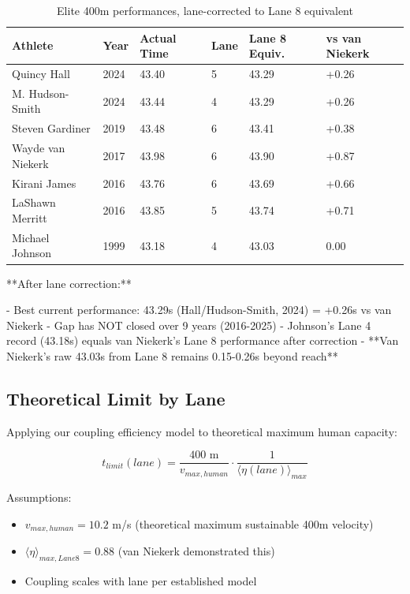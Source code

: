 \begin{table}[H]
\centering
\caption{Elite 400m performances, lane-corrected to Lane 8 equivalent}
\begin{tabular}{@{}llllll@{}}
\toprule
\textbf{Athlete} & \textbf{Year} & \textbf{Actual Time} & \textbf{Lane} & \textbf{Lane 8 Equiv.} & \textbf{vs van Niekerk} \\
\midrule
Quincy Hall & 2024 & 43.40 & 5 & 43.29 & +0.26 \\
M. Hudson-Smith & 2024 & 43.44 & 4 & 43.29 & +0.26 \\
Steven Gardiner & 2019 & 43.48 & 6 & 43.41 & +0.38 \\
Wayde van Niekerk & 2017 & 43.98 & 6 & 43.90 & +0.87 \\
Kirani James & 2016 & 43.76 & 6 & 43.69 & +0.66 \\
LaShawn Merritt & 2016 & 43.85 & 5 & 43.74 & +0.71 \\
Michael Johnson & 1999 & 43.18 & 4 & 43.03 & 0.00 \\
\bottomrule
\end{tabular}
\end{table}

**After lane correction:**

- Best current performance: 43.29s (Hall/Hudson-Smith, 2024) = +0.26s vs van Niekerk
- Gap has NOT closed over 9 years (2016-2025)
- Johnson's Lane 4 record (43.18s) equals van Niekerk's Lane 8 performance after correction
- **Van Niekerk's raw 43.03s from Lane 8 remains 0.15-0.26s beyond reach**

\subsection{Theoretical Limit by Lane}

Applying our coupling efficiency model to theoretical maximum human capacity:

\begin{equation}
t_{limit}(lane) = \frac{400 \text{ m}}{v_{max,human}} \cdot \frac{1}{\langle \eta(lane) \rangle_{max}}
\end{equation}

Assumptions:
\begin{itemize}
    \item $v_{max,human} = 10.2$ m/s (theoretical maximum sustainable 400m velocity)
    \item $\langle \eta \rangle_{max,Lane8} = 0.88$ (van Niekerk demonstrated this)
    \item Coupling scales with lane per established model
\end{itemize}

